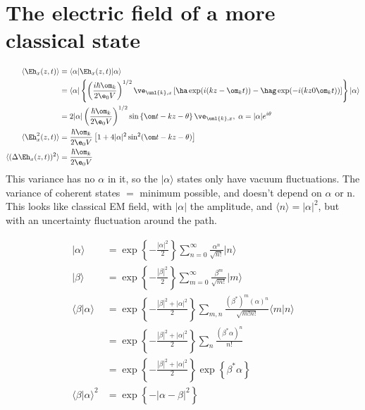 \documentclass[a4paper, 11pt, normalem]{report}
\begin{document}
\section{The electric field of a more classical state}
\begin{align}
    \langle\Eh_x(z,t)\rangle &= \langle\alpha|\Eh_x(z,t)|\alpha\rangle \\
                             &= \langle\alpha|\left\{\left(\frac{i\hbar\om_k}{2\e_0V}\right)^{1/2}\ve_{\unl{k},x}\left[\ha\exp(i(kz-\om_kt)) - \hag\exp(-i(kz0\om_kt))\right]\right\}|\alpha\rangle \\
                             &= 2|\alpha|\left(\frac{\hbar\om_k}{2\e_0V}\right)^{1/2}\sin\left\{\om t - kz - \theta\right\}\ve_{\unl{k},x},\; \alpha = |\alpha|e^{i\theta} \\
    \langle\Eh_x^2(z,t)\rangle &= \frac{\hbar\om_k}{2\e_0V}\left[1+4|\alpha|^2\sin^2(\om t-kz-\theta)\right] \\
    \langle(\Delta \Eh_x(z,t))^2\rangle &= \frac{\hbar\om_k}{2\e_0V}
\end{align}
This variance has no $\alpha$ in it, so the $|\alpha\rangle$ states only have vacuum fluctuations.
The variance of coherent states $=$ minimum possible, and doesn't depend on $\alpha$ or n.
This looks like classical EM field, with $|\alpha|$ the amplitude, and $\langle n\rangle = |\alpha|^2$, but with an uncertainty fluctuation around the path.
\begin{figure}[H]
    \centering
\end{figure}
\begin{align}
    |\alpha\rangle &= \exp\left\{-\frac{|\alpha|^2}{2}\right\}\sum_{n=0}^\infty \frac{\alpha^n}{\sqrt{n!}}|n\rangle \\
    |\beta\rangle &= \exp\left\{-\frac{|\beta|^2}{2}\right\}\sum_{m=0}^\infty \frac{\beta^m}{\sqrt{m!}}|m\rangle \\
    \langle\beta|\alpha\rangle &= \exp\left\{-\frac{|\beta|^2+|\alpha|^2}{2}\right\}\sum_{m,n} \frac{(\beta^*)^m(\alpha)^n}{\sqrt{m!n!}}\langle m|n\rangle \\
                               &= \exp\left\{-\frac{|\beta|^2+|\alpha|^2}{2}\right\}\sum_n \frac{(\beta^*\alpha)^n}{n!} \\
                               &= \exp\left\{-\frac{|\beta|^2+|\alpha|^2}{2}\right\}\exp\left\{\beta^*\alpha\right\} \\
    \langle\beta|\alpha\rangle^2 &= \exp\left\{-|\alpha-\beta|^2\right\}
\end{align}
\end{document}
